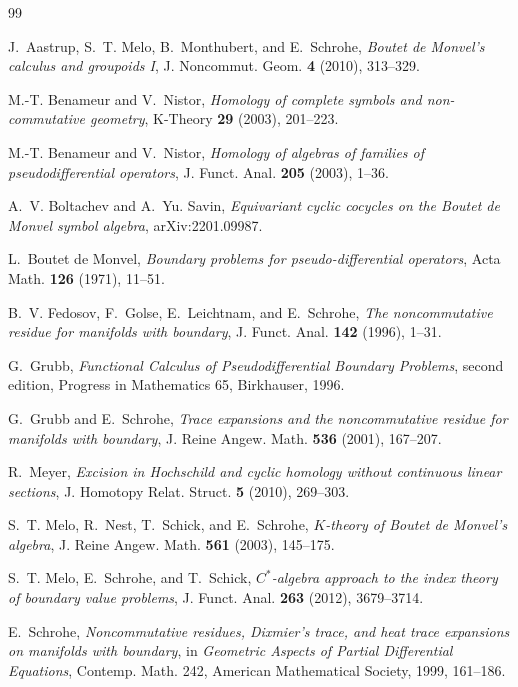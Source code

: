 \documentclass[11pt,oneside,reqno]{article}
\theoremstyle{plain}
\theoremstyle{definition}
\theoremstyle{remark}
\begin{document}
\begin{thebibliography}{99}

J.~Aastrup, S.~T. Melo, B.~Monthubert, and E.~Schrohe,
\emph{Boutet de Monvel's calculus and groupoids I},
J. Noncommut. Geom. \textbf{4} (2010), 313--329.

M.-T. Benameur and V.~Nistor,
\emph{Homology of complete symbols and non-commutative geometry},
K-Theory \textbf{29} (2003), 201--223.

M.-T. Benameur and V.~Nistor,
\emph{Homology of algebras of families of pseudodifferential operators},
J. Funct. Anal. \textbf{205} (2003), 1--36.

A.~V. Boltachev and A.~Yu. Savin,
\emph{Equivariant cyclic cocycles on the Boutet de Monvel symbol algebra},
arXiv:2201.09987.

L.~Boutet de Monvel,
\emph{Boundary problems for pseudo-differential operators},
Acta Math. \textbf{126} (1971), 11--51.

B.~V. Fedosov, F.~Golse, E.~Leichtnam, and E.~Schrohe,
\emph{The noncommutative residue for manifolds with boundary},
J. Funct. Anal. \textbf{142} (1996), 1--31.

G.~Grubb,
\emph{Functional Calculus of Pseudodifferential Boundary Problems},
second edition, Progress in Mathematics 65, Birkhauser, 1996.

G.~Grubb and E.~Schrohe,
\emph{Trace expansions and the noncommutative residue for manifolds with
boundary},
J. Reine Angew. Math. \textbf{536} (2001), 167--207.

R.~Meyer,
\emph{Excision in Hochschild and cyclic homology without continuous linear
sections},
J. Homotopy Relat. Struct. \textbf{5} (2010), 269--303.

S.~T. Melo, R.~Nest, T.~Schick, and E.~Schrohe,
\emph{\(K\)-theory of Boutet de Monvel's algebra},
J. Reine Angew. Math. \textbf{561} (2003), 145--175.

S.~T. Melo, E.~Schrohe, and T.~Schick,
\emph{\(C^*\)-algebra approach to the index theory of boundary value
problems},
J. Funct. Anal. \textbf{263} (2012), 3679--3714.

E.~Schrohe,
\emph{Noncommutative residues, Dixmier's trace, and heat trace expansions on
manifolds with boundary},
in \emph{Geometric Aspects of Partial Differential Equations},
Contemp. Math. 242, American Mathematical Society, 1999, 161--186.

\end{thebibliography}
\end{document}
